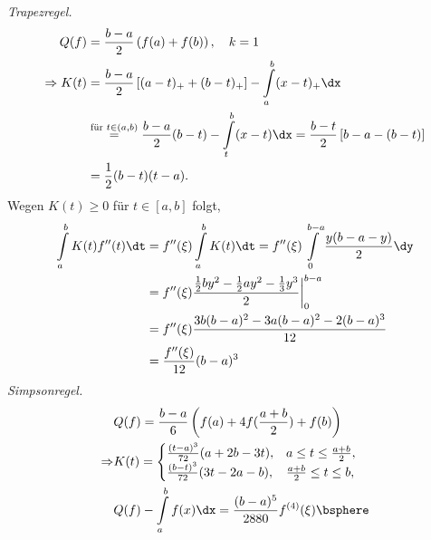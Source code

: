 \begin{bspn}
\textit{Trapezregel.}
\begin{align*}
Q(f) &= \frac{b-a}{2}\left(f(a) + f(b) \right),\quad k=1\\
\Rightarrow K(t) &= \frac{b-a}{2}\left[(a-t)_+ + (b-t)_+\right] -
\int\limits_a^b (x-t)_+\dx\\
&\overset{\text{für }t\in(a,b)}{=}
\frac{b-a}{2}(b-t)- \int\limits_t^b (x-t)\dx
= \frac{b-t}{2}\left[b-a-(b-t)\right] \\& = \frac{1}{2}(b-t)(t-a).
\end{align*}
Wegen $K(t)\ge0$ für $t\in[a,b]$ folgt,
\begin{align*}
\int\limits_a^b K(t)f''(t)\dt &= f''(\xi)\int\limits_a^b K(t)\dt
= f''(\xi)\int\limits_0^{b-a} \frac{y(b-a-y)}{2} \dy\\
&= f''(\xi) \frac{\frac{1}{2}by^2 - \frac{1}{2}ay^2 -
\frac{1}{3}y^3}{2}\bigg|_0^{b-a}\\
&= f''(\xi) \frac{3b(b-a)^2 - 3a(b-a)^2 -
2(b-a)^3}{12}\\
&=\frac{f''(\xi)}{12}(b-a)^3
\end{align*}
\textit{Simpsonregel.}
\begin{align*}
&Q(f) = \frac{b-a}{6}\left(f(a) + 4f(\frac{a+b}{2}) + f(b) \right)\\ 
\Rightarrow &K(t) = 
\begin{cases}
\frac{(t-a)^3}{72}(a+2b-3t), & a\le t\le \frac{a+b}{2},\\
\frac{(b-t)^3}{72}(3t-2a-b), & \frac{a+b}{2}\le t\le b,
\end{cases}\\
&Q(f) -\int\limits_a^b f(x)\dx = \frac{(b-a)^5}{2880} f^{(4)}(\xi)\bsphere
\end{align*}
\end{bspn}

